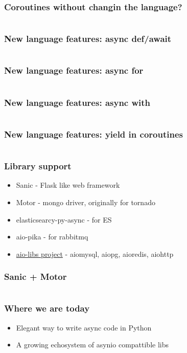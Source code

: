 \documentclass{beamer}
\begin{document}
\begin{frame}[fragile]
  \frametitle{Coroutines without changin the language?}
  \inputminted[fontsize=\footnotesize]{python}{code/coro.py}
\end{frame}

\begin{frame}[fragile]
  \frametitle{New language features: async def/await}
  \inputminted[fontsize=\footnotesize]{python}{code/async1.py}
\end{frame}


\begin{frame}[fragile]
  \frametitle{New language features: async for}
  \inputminted[fontsize=\footnotesize]{python}{code/async2.py}
\end{frame}

\begin{frame}[fragile]
  \frametitle{New language features: async with}
  \inputminted[fontsize=\footnotesize]{python}{code/async3.py}
\end{frame}

\begin{frame}[fragile]
  \frametitle{New language features: yield in coroutines}
  \inputminted[fontsize=\footnotesize]{python}{code/async4.py}
\end{frame}

\begin{frame}
  \frametitle{Library support}
  \begin{itemize}
    \item Sanic - Flask like web framework
    \item Motor - mongo driver, originally for tornado
    \item elasticsearcy-py-async - for ES
    \item aio-pika - for rabbitmq
    \item \href{https://github.com/aio-libs}{aio-libs project} - aiomysql, aiopg, aioredis, aiohttp
  \end{itemize}
\end{frame}

\begin{frame}[fragile]
  \frametitle{Sanic + Motor}
  \inputminted[fontsize=\footnotesize]{python}{code/sanic.py}
\end{frame}

\begin{frame}
  \frametitle{Where we are today}
  \begin{itemize}
    \item Elegant way to write async code in Python
    \item A growing echosystem of asynio compattible libs
  \end{itemize}
\end{frame}
\end{document}

